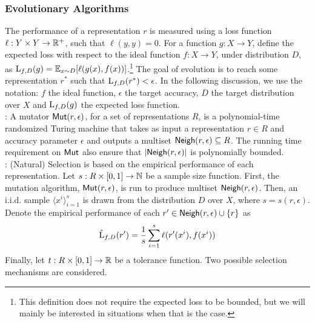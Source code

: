 \subsubsection*{Evolutionary Algorithms}

The performance of a representation $r$ is measured using a loss function $\ell
: Y \times Y \rightarrow \mathbb{R}^+$, such that $\ell(y, y) = 0$. For a function
$g : X \rightarrow Y$, define the expected loss with respect to the ideal
function $f : X \rightarrow Y$, under distribution $D$, as $\mathrm{L}_{f, D}(g) =
\mathbb{E}_{x \sim D}[\ell(g(x), f(x))]$.\footnote{This definition does not require the
expected loss to be bounded, but we will mainly be interested in situations when
that is the case.} The goal of evolution is to reach some representation $r^*$
such that $\mathrm{L}_{f, D}(r^*) < \epsilon$. In the following discussion, we use
the notation: $f$ the ideal function, $\epsilon$ the target accuracy, $D$ the
target distribution over $X$ and $\mathrm{L}_{f, D}(g)$ the expected loss function.  \medskip \\
%
: A mutator $\mathsf{Mut}(r, \epsilon)$, for a set of representations $R$, is
a polynomial-time randomized Turing machine that takes as input a representation
$r \in R$ and accuracy parameter $\epsilon$ and outputs a multiset $\mathsf{Neigh}(r,
\epsilon) \subseteq R$. The running time requirement on $\mathsf{Mut}$ also ensure that
$|\mathsf{Neigh}(r, \epsilon)|$ is polynomially bounded. \medskip \\
%
: (Natural) Selection is based on the empirical performance
of each representation. Let $s : R \times [0, 1] \rightarrow \mathbb{N}$ be a
sample size function. First, the mutation algorithm, $\mathsf{Mut}(r, \epsilon)$, is run
to produce multiset $\mathsf{Neigh}(r, \epsilon)$. Then, an i.i.d. sample $\langle x^i
\rangle_{i=1}^s$ is drawn from the distribution $D$ over $X$, where $s = s(r,
\epsilon)$.  Denote the empirical performance of each $r^\prime \in \mathsf{Neigh}(r,
\epsilon) \cup \{r \}$ as
%
\[ \hat{\mathrm{L}}_{f, D}(r^\prime) = \frac{1}{s}\sum_{i=1}^s \ell(r^\prime(x^i),
f(x^i)) \]
%
Finally, let $t : R \times [0, 1] \rightarrow \mathbb{R}$ be a tolerance function.
Two possible selection mechanisms are considered.
